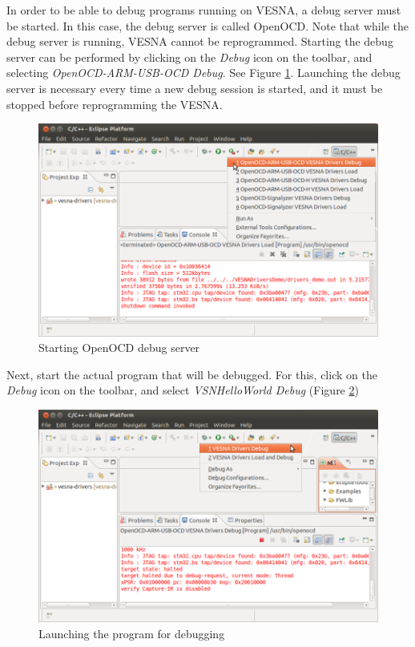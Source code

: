 \documentclass[a4paper, 10pt]{article}
\begin{document}
In order to be able to debug programs running on VESNA,
a debug server must be started.
In this case, the debug server is called OpenOCD.
Note that while the debug server is running, VESNA cannot be reprogrammed.
Starting the debug server can be performed by clicking on the
\emph{Debug} icon on the toolbar, and selecting
\emph{OpenOCD-ARM-USB-OCD Debug}.
See Figure \ref{fig:debug-openocd-start}.
Launching the debug server is necessary every time a new debug session is started,
and it must be stopped before reprogramming the VESNA.

    \begin{figure}[H]
    \centering
        \includegraphics[width=\textwidth]{./install-guide-linux-images/debug-openocd-start.png}
        \caption{Starting OpenOCD debug server}
        \label{fig:debug-openocd-start}
    \end{figure}

Next, start the actual program that will be debugged.
For this, click on the \emph{Debug} icon on the toolbar, and select
\emph{VSNHelloWorld Debug}
(Figure \ref{fig:debug-launch})

    \begin{figure}[H]
    \centering
        \includegraphics[width=\textwidth]{./install-guide-linux-images/debug-launch.png}
        \caption{Launching the program for debugging}
        \label{fig:debug-launch}
    \end{figure}
\end{document}
